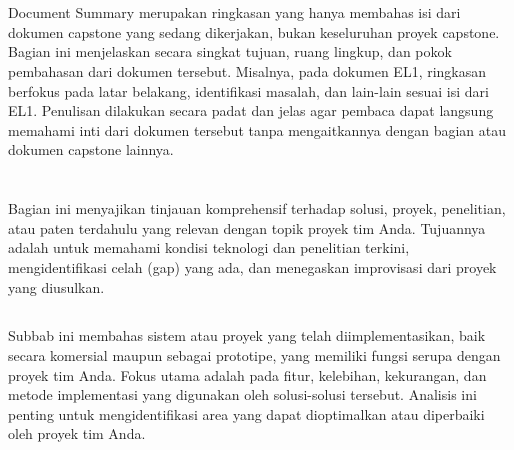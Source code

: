 \documentclass{elsinta}
\begin{document}
\coverpage
\newpage

\approvalpage

\newpage


\clearpage
{}
\setcounter{page}{1} 
\pagestyle{myfooter} %


\tableofcontents
\newpage
\section*{\docsumary}
Document Summary merupakan ringkasan yang hanya membahas isi dari dokumen capstone yang sedang dikerjakan, bukan keseluruhan proyek capstone. Bagian ini menjelaskan secara singkat tujuan, ruang lingkup, dan pokok pembahasan dari dokumen tersebut. Misalnya, pada dokumen EL1, ringkasan berfokus pada latar belakang, identifikasi masalah, dan lain-lain sesuai isi dari EL1.  Penulisan dilakukan secara padat dan jelas agar pembaca dapat langsung memahami inti dari dokumen tersebut tanpa mengaitkannya dengan bagian atau dokumen capstone lainnya.
\newpage



\section{\ProjectBenchmarkTitle}
Bagian ini menyajikan tinjauan komprehensif terhadap solusi, proyek, penelitian, atau paten terdahulu yang relevan dengan topik proyek tim Anda. Tujuannya adalah untuk memahami kondisi teknologi dan penelitian terkini, mengidentifikasi celah (gap) yang ada, dan menegaskan improvisasi dari proyek yang diusulkan.

\subsection{\PrevProjectsTitle}
Subbab ini membahas sistem atau proyek yang telah diimplementasikan, baik secara komersial maupun sebagai prototipe, yang memiliki fungsi serupa dengan proyek tim Anda. Fokus utama adalah pada fitur, kelebihan, kekurangan, dan metode implementasi yang digunakan oleh solusi-solusi tersebut. Analisis ini penting untuk mengidentifikasi area yang dapat dioptimalkan atau diperbaiki oleh proyek tim Anda.
\end{document}
